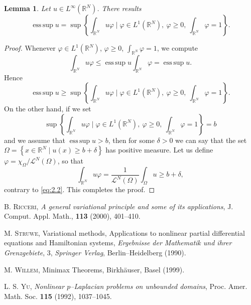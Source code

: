\documentclass[11pt]{scrartcl}
\numberwithin{equation}{section}
\newtheorem{lemma}[theorem]{Lemma}
\theoremstyle{definition}
\theoremstyle{remark}
\numberwithin{equation}{section}
\begin{document}
\begin{lemma}
Let \(u \in L^\infty(\mathbb{R}^N)\). There results
\begin{equation} \label{eq:2.1}
\operatorname{ess\, sup} u = \sup \left\{ \int_{\mathbb{R}^N} u \varphi \mid \varphi \in L^1(\mathbb{R}^N), \ \varphi \geq 0, \ \int_{\mathbb{R}^N} \varphi =1 \right\}.
\end{equation}
\end{lemma}
\begin{proof}
Whenever \(\varphi \in L^1(\mathbb{R}^N)\), \(\varphi \geq 0\), \( \int_{\mathbb{R}^N} \varphi =1\), we compute
\begin{equation*}
\int_{\mathbb{R}^N} u \varphi \leq \operatorname{ess\, sup} u \int_{\mathbb{R}^N} \varphi = \operatorname{ess\, sup} u.
\end{equation*}
Hence
\begin{equation} \label{eq:2.2}
\operatorname{ess\, sup} u \geq \sup \left\{ \int_{\mathbb{R}^N} u \varphi \mid \varphi \in L^1(\mathbb{R}^N), \ \varphi \geq 0, \ \int_{\mathbb{R}^N} \varphi =1 \right\}.
\end{equation}
On the other hand, if we set
\begin{equation*}
\sup \left\{ \int_{\mathbb{R}^N} u \varphi \mid \varphi \in L^1(\mathbb{R}^N), \ \varphi \geq 0, \ \int_{\mathbb{R}^N} \varphi =1 \right\} = b
\end{equation*}
and we assume that \(\operatorname{ess\, sup} u >  b\),
then for some \(\delta>0\) we can say  that the set \(\Omega = \left\{ x \in \mathbb{R}^N \mid u(x) \geq b + \delta \right\}\) has positive measure. Let us define \(\varphi = \chi_\Omega / \mathcal{L}^N(\Omega)\), so that 
\begin{equation*}
\int_{\mathbb{R}^N} u \varphi = \frac{1}{\mathcal{L}^N(\Omega)} \int_\Omega u \geq b+\delta,
\end{equation*}
contrary to \eqref{eq:2.2}. This completes the proof.
\end{proof}

\begin{thebibliography}{99}


 \textsc{B. Ricceri},\emph{ A general variational principle and some of its applications},
 J. Comput. Appl. Math., \textbf{ 113}  (2000), 401--410.

 \textsc{M. Struwe}, Variational methods,
Applications to nonlinear partial differential equations and Hamiltonian systems,
\emph{ Ergebnisse der Mathematik und ihrer Grenzgebiete},  3,
\emph{ Springer Verlag}, Berlin--Heidelberg (1990).

 \textsc{M. Willem}, {Minimax Theorems}, Birkh\"auser, Basel (1999).

 \textsc{L. S. Yu}, \emph{Nonlinear $p$--Laplacian problems on unbounded domains}, Proc. Amer. Math. Soc.
\textbf{115} (1992), 1037--1045.

\end{thebibliography}
\end{document}
